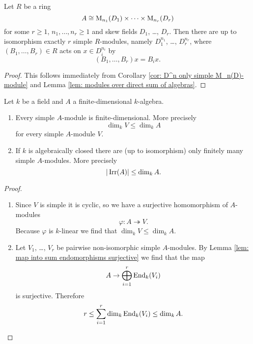 \begin{cor}\label{cor: simple modules over product of matrix algebras}
  Let $R$ be a ring
  \[
    A \cong \operatorname{M}_{n_1}(D_1) \times \dotsb \times \operatorname{M}_{n_r}(D_r)
  \]
  for some $r \geq 1$, $n_1, \dotsc, n_r \geq 1$ and skew fields $D_1$, \dots, $D_r$. Then there are up to isomorphism exactly $r$ simple $R$-modules, namely $D_1^{n_1}$, \dots, $D_r^{n_r}$, where $(B_1, \dotsc, B_r) \in R$ acts on $x \in D_i^{n_i}$ by
  \[
    (B_1, \dotsc, B_r) x =  B_i x.
  \]
\end{cor}
\begin{proof}
  This follows immediately from Corollary \ref{cor: D^n only simple M_n(D)-module} and Lemma \ref{lem: modules over direct sum of algebras}.
\end{proof}


\begin{prop}\label{prop: simple modules over finite-dimensional algebras}
  Let $k$ be a field and $A$ a finite-dimensional $k$-algebra.
  \begin{enumerate}[label=\emph{\alph*)},leftmargin=*]
    \item
      Every simple $A$-module is finite-dimensional. More precisely
      \[
        \dim_k V \leq \dim_k A
      \]
      for every simple $A$-module $V$.
    \item
      If $k$ is algebraically closed there are (up to isomorphism) only finitely many simple $A$-modules. More precisely
      \[
        |\operatorname{Irr}(A)| \leq \dim_k A.
      \]
  \end{enumerate}
\end{prop}
\begin{proof}
  \begin{enumerate}[label=\emph{\alph*)},leftmargin=*]
    \item
      Since $V$ is simple it is cyclic, so we have a surjective homomorphism of $A$-modules
      \[
        \varphi \colon A \twoheadrightarrow V.
      \]
      Because $\varphi$ is $k$-linear we find that $\dim_k V \leq \dim_k A$.
    \item
      Let $V_1$, \dots, $V_r$ be pairwise non-isomorphic simple $A$-modules. By Lemma \ref{lem: map into sum endomorphisms surjective} we find that the map
      \[
        A \to \bigoplus_{i=1}^r \operatorname{End}_k(V_i)
      \]
      is surjective. Therefore
      \[
        r \leq \sum_{i=1}^r \dim_k \operatorname{End}_k(V_i) \leq \dim_k A.
        \qedhere
      \]
  \end{enumerate}
\end{proof}



